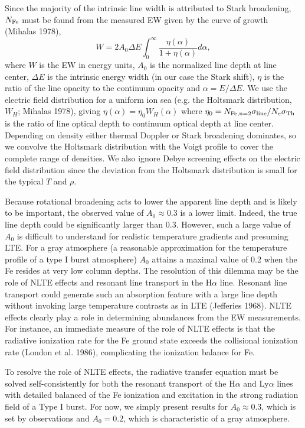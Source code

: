 \documentclass[iop,apjl,letterpaper]{emulateapj}
\begin{document}
Since the majority of the intrinsic line width is attributed to Stark
broadening, $N_{\rm Fe}$  must be found from the measured EW
given by the curve of growth (Mihalas 1978),
\begin{equation}
W = 2 A_0 \Delta E \int_0^{\infty} \frac {\eta(\alpha)} {1 +
\eta(\alpha)} d\alpha,
\end{equation}
where $W$ is the EW in energy units, $A_0$ is the normalized line
depth at line center, $\Delta E$ is the intrinsic energy width (in our
case the Stark shift), $\eta$ is the ratio of the line opacity to the
continuum opacity and $\alpha = E/\Delta E$. We use the electric field
distribution for a uniform ion sea (e.g. the Holtsmark distribution,
$W_H$; Mihalas 1978), giving $\eta(\alpha) = \eta_0 W_H(\alpha)$ where
$\eta_0 = {N_{\rm Fe, n=2} \sigma_{\rm line}}/{N_e \sigma_{\rm Th}}$
is the ratio of line optical depth to continuum optical depth at line
center. Depending on density either thermal Doppler or Stark
broadening dominates, so we convolve the Holtsmark distribution with
the Voigt profile to cover the complete range of densities.  We also
ignore Debye screening effects on the electric field distribution
since the deviation from the Holtsmark distribution is small for the
typical $T$ and $\rho$.

 Because rotational broadening acts to lower the apparent line depth
and is likely to be important, the observed value of $A_0\approx 0.3 $
is a lower limit. Indeed, the true line depth could be significantly
larger than 0.3. However, such a large value of $A_0$ is difficult to
understand for realistic temperature gradients and presuming LTE. For
a gray atmosphere (a reasonable approximation for the temperature
profile of a type I burst atmosphere) $A_0$ attains a maximal value of
0.2 when the Fe resides at very low column depths.  The resolution of
this dilemma may be the role of NLTE effects and resonant line
transport in the H$\alpha$ line. Resonant line transport could
generate such an absorption feature with a large line depth without
invoking large temperature contrasts as in LTE (Jefferies 1968). NLTE
effects clearly play a role in determining abundances from the EW
measurements.  For instance, an immediate measure of the role of NLTE
effects is that the radiative ionization rate for the Fe ground state
exceeds the collisional ionization rate (London et al. 1986),
complicating the ionization balance for Fe.

 To resolve the role of NLTE effects, the radiative transfer equation
must be solved self-consistently for both the resonant transport of
the H$\alpha$ and Ly$\alpha$ lines with detailed balanced of the Fe
ionization and excitation in the strong radiation field of a Type I
burst. For now, we simply present results for $A_0 \approx 0.3$, which
is set by observations and $A_0 = 0.2$, which is characteristic of a
gray atmosphere.
\end{document}
